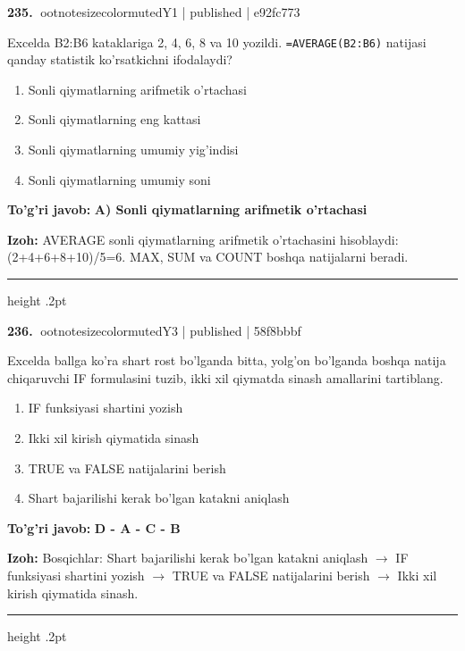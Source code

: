 \documentclass[10pt,a4paper]{article}
\begin{document}
\textbf{\color{ink}235.} {ootnotesizecolor{muted}Y1 | published | e92fc773}
\par
Excelda B2:B6 kataklariga 2, 4, 6, 8 va 10 yozildi. \texttt{=AVERAGE(B2:B6)} natijasi qanday statistik ko'rsatkichni ifodalaydi?
\begin{enumerate}[label=\Alph*),leftmargin=9mm]
\item Sonli qiymatlarning arifmetik o'rtachasi
\item Sonli qiymatlarning eng kattasi
\item Sonli qiymatlarning umumiy yig'indisi
\item Sonli qiymatlarning umumiy soni
\end{enumerate}
\begin{tcolorbox}[enhanced,breakable,colback=teal!4,colframe=teal!55!black,boxrule=0.45pt,arc=1.2mm,left=2.8mm,right=2.8mm,top=2mm,bottom=2mm]
\textbf{\color{teal}To'g'ri javob:} \textbf{A) Sonli qiymatlarning arifmetik o'rtachasi}
\par\smallskip
\textbf{Izoh:} AVERAGE sonli qiymatlarning arifmetik o'rtachasini hisoblaydi: (2+4+6+8+10)/5=6. MAX, SUM va COUNT boshqa natijalarni beradi.
\end{tcolorbox}
\vspace{2mm}\hrule height .2pt\vspace{2mm}

\textbf{\color{ink}236.} {ootnotesizecolor{muted}Y3 | published | 58f8bbbf}
\par
Excelda ballga ko'ra shart rost bo'lganda bitta, yolg'on bo'lganda boshqa natija chiqaruvchi IF formulasini tuzib, ikki xil qiymatda sinash amallarini tartiblang.
\begin{enumerate}[label=\Alph*),leftmargin=9mm]
\item IF funksiyasi shartini yozish
\item Ikki xil kirish qiymatida sinash
\item TRUE va FALSE natijalarini berish
\item Shart bajarilishi kerak bo'lgan katakni aniqlash
\end{enumerate}
\begin{tcolorbox}[enhanced,breakable,colback=teal!4,colframe=teal!55!black,boxrule=0.45pt,arc=1.2mm,left=2.8mm,right=2.8mm,top=2mm,bottom=2mm]
\textbf{\color{teal}To'g'ri javob:} \textbf{D - A - C - B}
\par\smallskip
\textbf{Izoh:} Bosqichlar: Shart bajarilishi kerak bo'lgan katakni aniqlash \ensuremath{\rightarrow} IF funksiyasi shartini yozish \ensuremath{\rightarrow} TRUE va FALSE natijalarini berish \ensuremath{\rightarrow} Ikki xil kirish qiymatida sinash.
\end{tcolorbox}
\vspace{2mm}\hrule height .2pt\vspace{2mm}
\end{document}
